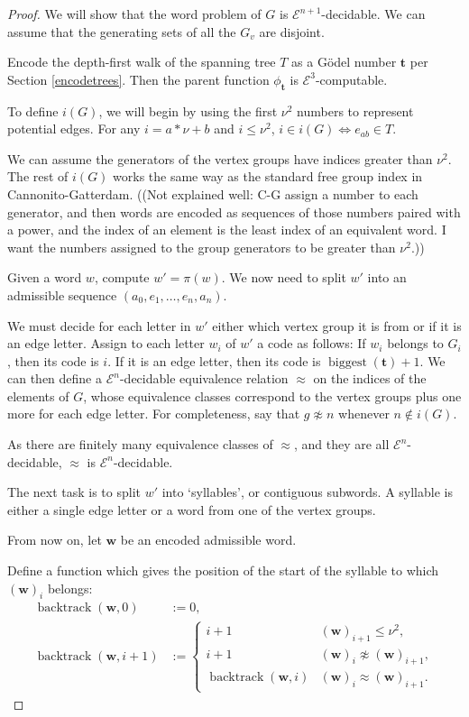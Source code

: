 \documentclass[a4paper]{article}
\newcommand{\grz}[1]{$\mathcal{E}^{#1}$}	%
\newcommand{\wvec}{\mathbf{w}}	%
\newcommand{\tvec}{\mathbf{t}}	%
\newcommand{\recur}[1]{\begin{equation} \begin{split} #1 \end{split} \end{equation}}	%
\theoremstyle{plain}
\theoremstyle{definition}
\begin{document}
\begin{proof}
We will show that the word problem of $G$ is \grz{n+1}-decidable. We can assume that the generating sets of all the $G_v$ are disjoint.

Encode the depth-first walk of the spanning tree $T$ as a G\"odel number $\tvec$ per Section \ref{encodetrees}. Then the parent function $\phi_{\tvec}$ is \grz{3}-computable. 

To define $i(G)$, we will begin by using the first $\nu^2$ numbers to represent potential edges. For any $i=a*\nu+b$ and $i \leq \nu^2$, $i \in i(G) \Leftrightarrow e_{ab} \in T$.

We can assume the generators of the vertex groups have indices greater than $\nu^2$. The rest of $i(G)$ works the same way as the standard free group index in Cannonito-Gatterdam.	((Not explained well: C-G assign a number to each generator, and then words are encoded as sequences of those numbers paired with a power, and the index of an element is the least index of an equivalent word. I want the numbers assigned to the group generators to be greater than $\nu^2$.))

Given a word $w$, compute $w' = \pi(w)$. We now need to split $w'$ into an admissible sequence $(a_0,e_1,\dots,e_n,a_n)$. 

We must decide for each letter in $w'$ either which vertex group it is from or if it is an edge letter. Assign to each letter $w_i$ of $w'$ a code as follows: If $w_i$ belongs to $G_i$, then its code is $i$. If it is an edge letter, then its code is $\operatorname{biggest}(\tvec)+1$. We can then define a \grz{n}-decidable equivalence relation $\approx$ on the indices of the elements of $G$, whose equivalence classes correspond to the vertex groups plus one more for each edge letter. For completeness, say that $g \not \approx n$ whenever $n \notin i(G)$.

As there are finitely many equivalence classes of $\approx$, and they are all \grz{n}-decidable, $\approx$ is \grz{n}-decidable.

The next task is to split $w'$ into `syllables', or contiguous subwords. A syllable is either a single edge letter or a word from one of the vertex groups.

From now on, let $\wvec$ be an encoded admissible word.

Define a function which gives the position of the start of the syllable to which $(\wvec)_i$ belongs:
\recur{
	\operatorname{backtrack}(\wvec,0) &:= 0, \\
	\operatorname{backtrack}(\wvec,i+1) &:= \begin{cases}
																					i+1	&	(\wvec)_{i+1} \leq \nu^2, \\
																					i+1	&	(\wvec)_i \not \approx (\wvec)_{i+1}, \\
																					\operatorname{backtrack}(\wvec,i)	&	(\wvec)_i \approx (\wvec)_{i+1}.
																				\end{cases}
}


\end{proof}
\end{document}
